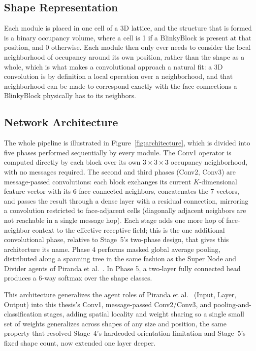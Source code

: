 \documentclass[12pt,a4paper]{report}
\begin{document}
\subsection{Shape Representation}

Each module is placed in one cell of a 3D lattice, and the structure that is formed is a binary occupancy volume, where a cell is 1 if a BlinkyBlock is present at that position, and 0 otherwise. Each module then only ever needs to consider the local neighborhood of occupancy around its own position, rather than the shape as a whole, which is what makes a convolutional approach a natural fit: a 3D convolution is by definition a local operation over a neighborhood, and that neighborhood can be made to correspond exactly with the face-connections a BlinkyBlock physically has to its neighbors.

\subsection{Network Architecture}

The whole pipeline is illustrated in Figure~\ref{fig:architecture}, which is divided into five phases performed sequentially by every module. The Conv1 operator is computed directly by each block over its own $3\times3\times3$ occupancy neighborhood, with no messages required. The second and third phases (Conv2, Conv3) are message-passed convolutions: each block exchanges its current $K$-dimensional feature vector with its 6 face-connected neighbors, concatenates the 7 vectors, and passes the result through a dense layer with a residual connection, mirroring a convolution restricted to face-adjacent cells (diagonally adjacent neighbors are not reachable in a single message hop). Each stage adds one more hop of face-neighbor context to the effective receptive field; this is the one additional convolutional phase, relative to Stage~5's two-phase design, that gives this architecture its name. Phase 4 performs masked global average pooling, distributed along a spanning tree in the same fashion as the Super Node and Divider agents of Piranda et al.~\cite{piranda2024ai4pm}. In Phase 5, a two-layer fully connected head produces a 6-way softmax over the shape classes.

This architecture generalizes the agent roles of Piranda et al.~\cite{piranda2024ai4pm} (Input, Layer, Output) into this thesis's Conv1, message-passed Conv2/Conv3, and pooling-and-classification stages, adding spatial locality and weight sharing so a single small set of weights generalizes across shapes of any size and position, the same property that resolved Stage~4's hardcoded-orientation limitation and Stage~5's fixed shape count, now extended one layer deeper.
\end{document}
